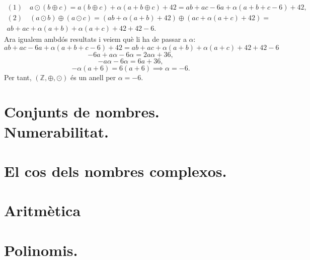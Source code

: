 \documentclass[11pt]{article}
\begin{document}
\begin{legal}
\begin{legal}
		\[
		\begin{array}{lcl}
			(1)\quad a\odot(b\oplus c)=a(b\oplus c)+\alpha(a+b\oplus c)+42=ab+ac-6a+\alpha(a+b+c-6)+42,\\
			(2)\quad (a\odot b)\oplus(a\odot c)=(ab+\alpha(a+b)+42)\oplus(ac+\alpha(a+c)+42)=\\
			ab+ac+\alpha(a+b)+\alpha(a+c)+42+42-6.
		\end{array}
		\]
		Ara igualem ambdós resultats i veiem què li ha de passar a $\alpha$:
		$$
		ab+ac-6a+\alpha(a+b+c-6)+42=ab+ac+\alpha(a+b)+\alpha(a+c)+42+42-6
		$$
		$$
		-6a+a\alpha-6\alpha=2a\alpha+36,
		$$
		$$
		-a\alpha-6\alpha=6a+36,
		$$
		$$
		-\alpha(a+6)=6(a+6)\implies \alpha=-6.
		$$
		Per tant, $(\mathbb{Z},\oplus,\odot)$ és un anell per $\alpha=-6$.
	\end{legal}
\end{legal}

\newpage

\section{Conjunts de nombres. Numerabilitat.}

\newpage

\section{El cos dels nombres complexos.}

\newpage

\section{Aritmètica}

\newpage

\section{Polinomis.}
\end{document}
